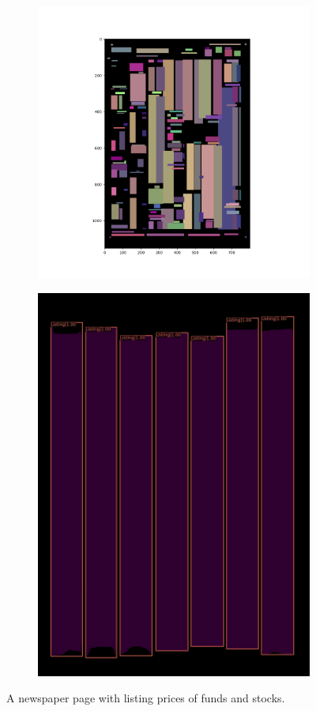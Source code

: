 \documentclass[aspectratio=1610]{beamer}
\begin{document}
\begin{frame}
  \begin{figure}
\centering
\begin{subfigure}{.5\textwidth}
  \centering
  \includegraphics[width=0.7\linewidth, clip=true, trim = 50mm 20mm 60mm 0mm]{figures/tf/zk6UnuL.png}
\end{subfigure}%
\begin{subfigure}{.5\textwidth}
  \centering
  \includegraphics[width=0.7\linewidth, clip=true, trim = 0mm 0mm 0mm 0mm]{figures/labels-vanilla-0.75/zk6UnuL.jpg}
\end{subfigure}
\caption{A newspaper page with listing prices of funds and stocks.}
\label{fig:stocks}
\end{figure}
\end{frame}
\normalpage
\end{document}
